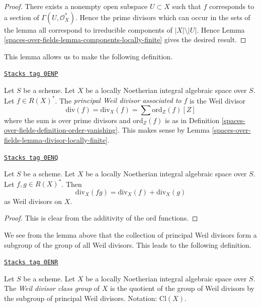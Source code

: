 \begin{proof}
There exists a nonempty open subspace $U \subset X$
such that $f$ corresponds to a section of $\Gamma(U, \mathcal{O}_X^*)$.
Hence the prime divisors which can occur in the sets of the lemma all
correspond to irreducible components of $|X| \setminus |U|$.
Hence Lemma \ref{spaces-over-fields-lemma-components-locally-finite} gives the desired result.
\end{proof}

This lemma allows us to make the following definition.

\begin{definition}
\label{spaces-over-fields-definition-principal-divisor}
\href{https://stacks.math.columbia.edu/tag/0ENP}{\texttt{Stacks tag 0ENP}}

Let $S$ be a scheme.
Let $X$ be a locally Noetherian integral algebraic space over $S$.
Let $f \in R(X)^*$.
The {\it principal Weil divisor associated to $f$} is the Weil divisor
$$
\text{div}(f) = \text{div}_X(f) = \sum \text{ord}_Z(f) [Z]
$$
where the sum is over prime divisors and $\text{ord}_Z(f)$ is as in
Definition \ref{spaces-over-fields-definition-order-vanishing}. This makes sense
by Lemma \ref{spaces-over-fields-lemma-divisor-locally-finite}.
\end{definition}

\begin{lemma}
\label{spaces-over-fields-lemma-div-additive}
\href{https://stacks.math.columbia.edu/tag/0ENQ}{\texttt{Stacks tag 0ENQ}}

Let $S$ be a scheme.
Let $X$ be a locally Noetherian integral algebraic space over $S$.
Let $f, g \in R(X)^*$. Then
$$
\text{div}_X(fg) = \text{div}_X(f) + \text{div}_X(g)
$$
as Weil divisors on $X$.
\end{lemma}

\begin{proof}
This is clear from the additivity of the $\text{ord}$ functions.
\end{proof}

We see from the lemma above that the collection of principal Weil divisors
form a subgroup of the group of all Weil divisors. This leads to the following
definition.

\begin{definition}
\label{spaces-over-fields-definition-class-group}
\href{https://stacks.math.columbia.edu/tag/0ENR}{\texttt{Stacks tag 0ENR}}

Let $S$ be a scheme.
Let $X$ be a locally Noetherian integral algebraic space over $S$. The
{\it Weil divisor class group} of $X$ is the quotient of
the group of Weil divisors by the subgroup of principal Weil divisors.
Notation: $\text{Cl}(X)$.
\end{definition}

